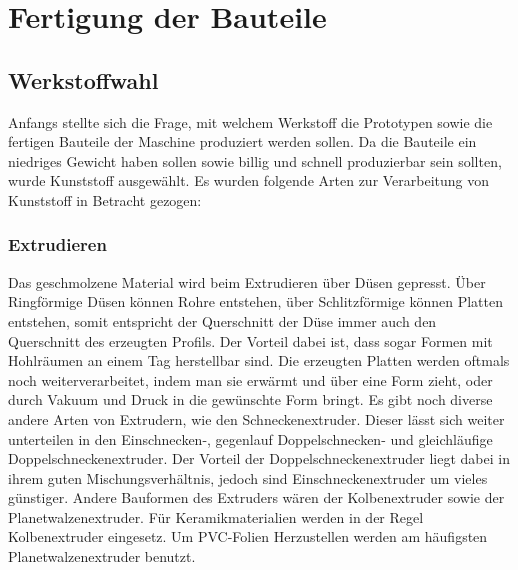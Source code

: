 \newpage
\section{Fertigung der Bauteile}
\subsection{Werkstoffwahl}
 Anfangs stellte sich die Frage, mit welchem Werkstoff die Prototypen sowie die fertigen Bauteile der
Maschine produziert werden sollen.
Da die Bauteile ein niedriges Gewicht haben sollen sowie billig und schnell produzierbar
sein sollten, wurde Kunststoff ausgewählt.
Es wurden folgende Arten zur Verarbeitung von Kunststoff in Betracht gezogen:
\subsubsection{Extrudieren}
Das geschmolzene Material wird beim Extrudieren über Düsen gepresst.
Über Ringförmige Düsen können Rohre entstehen, über Schlitzförmige können Platten entstehen, somit entspricht der Querschnitt der Düse immer auch den Querschnitt des erzeugten Profils.
Der Vorteil dabei ist, dass sogar Formen mit Hohlräumen an einem Tag herstellbar sind.
Die erzeugten Platten werden oftmals noch weiterverarbeitet, indem man sie erwärmt und über eine Form zieht, oder durch
Vakuum und Druck in die gewünschte Form bringt.
Es gibt noch diverse andere Arten von Extrudern, wie den Schneckenextruder.
Dieser lässt sich weiter unterteilen in den Einschnecken-, gegenlauf Doppelschnecken- und gleichläufige Doppelschneckenextruder.
Der Vorteil der Doppelschneckenextruder liegt dabei in ihrem guten Mischungsverhältnis, jedoch sind Einschneckenextruder um vieles günstiger.
Andere Bauformen des Extruders wären der Kolbenextruder sowie der Planetwalzenextruder.
Für Keramikmaterialien werden in der Regel Kolbenextruder eingesetz.
Um PVC-Folien Herzustellen werden am häufigsten Planetwalzenextruder benutzt.


